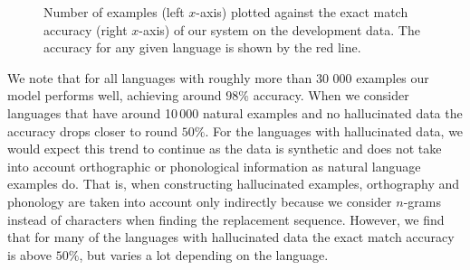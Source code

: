 \documentclass[11pt,a4paper]{article}
\begin{document}
\begin{figure}
\caption{\label{fig:data_acc} Number of examples (left $x$-axis)
plotted against the exact match accuracy (right $x$-axis) of our
system on the development data. The accuracy for any given language is
shown by the red line.}
\end{figure}

We note that for all languages with roughly more than 30 000 examples
our model performs well, achieving around $98\%$ accuracy. When
we consider languages that have around 10\,000 natural examples and
no hallucinated data the accuracy drops closer to round $50\%$. For
the languages with hallucinated data, we would expect this trend to
continue as the data is synthetic and does not take into account
orthographic or phonological information as natural language examples
do.  That is, when constructing hallucinated examples, orthography and
phonology are taken into account only indirectly because we consider
$n$-grams instead of characters when finding the replacement
sequence. However, we find that for many of the languages with
hallucinated data the exact match accuracy is above $50\%$, but varies
a lot depending on the language.
\end{document}
